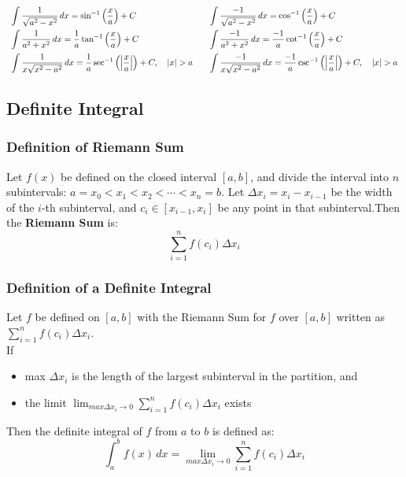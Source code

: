\documentclass[11pt]{article}
\begin{document}
$
    \begin{array}{l@{\qquad}l}
        \displaystyle \int \frac{1}{\sqrt{a^2 - x^2}}\,dx = \sin^{-1}\left(\frac{x}{a}\right) + C
        & \displaystyle \int \frac{-1}{\sqrt{a^2 - x^2}}\,dx = \cos^{-1}\left(\frac{x}{a}\right) + C \\[10pt]
        \displaystyle\int \frac{1}{a^2 + x^2}\,dx = \frac{1}{a} \tan^{-1}\left(\frac{x}{a}\right) + C
        & \displaystyle \int \frac{-1}{a^2 + x^2}\,dx = \frac{-1}{a} \cot^{-1}\left(\frac{x}{a}\right) + C \\[10pt]
        \displaystyle\int \frac{1}{x\sqrt{x^2 - a^2}}\,dx = \frac{1}{a} \sec^{-1}\left(\left| \frac{x}{a} \right|\right) + C, \quad |x| > a
        & \displaystyle \int \frac{-1}{x\sqrt{x^2 - a^2}}\,dx = \frac{-1}{a} \csc^{-1}\left(\left| \frac{x}{a} \right|\right) + C, \quad |x| > a
    \end{array}
$
\subsection{Definite Integral}
\subsubsection*{Definition of Riemann Sum}
Let $f(x)$ be defined on the closed interval $[a,b]$, and divide the interval into $n$ subintervals:
$a = x_0 < x_1 < x_2 < \cdots < x_n = b$.
Let $\Delta x_i = x_i - x_{i-1}$ be the width of the $i$-th subinterval, 
and $c_i \in [x_{i-1}, x_i]$ be any point in that subinterval.Then the \textbf{Riemann Sum} is:
\[\sum_{i=1}^n f(c_i) \Delta x_i\]
\subsubsection*{Definition of a Definite Integral}
Let $f$ be defined on $[a,b]$ with the Riemann Sum for $f$ over $[a,b]$ written as $\displaystyle\sum_{i=1}^n f(c_i) \Delta x_i$.\\
If 
\begin{itemize}
    \item max $\Delta x_i$ is the length of the largest subinterval in the partition, and
    \item the limit $\displaystyle\lim_{max \Delta x_i\to 0}\sum_{i=1}^{n}f(c_i)\Delta x_i$ exists
\end{itemize}
Then the definite integral of $f$ from $a$ to $b$ is defined as:
\[
    \int_a^bf(x)\,dx=\lim_{max \Delta x_i\to 0}\sum_{i=1}^{n}f(c_i)\Delta x_i
\]
\end{document}
